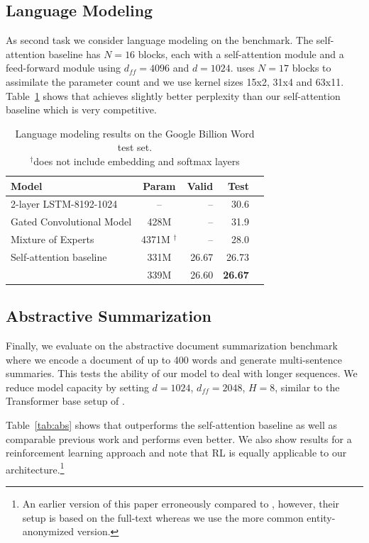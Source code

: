 \subsection{Language Modeling}\label{sec:lm}

As second task we consider language modeling on the \gbw{} benchmark. 
The self-attention baseline has $N=16$ blocks, each with a self-attention module and a feed-forward module using $d_{ff} = 4096$ and $d=1024$.
\tvsdconv{} uses $N=17$ blocks to assimilate the parameter count and we use kernel sizes 15x2, 31x4 and 63x11.
Table~\ref{tab:gbw_lm} shows that \tvsdconv{} achieves slightly better perplexity than our self-attention baseline which is very competitive.

\begin{table}
\centering
\begin{tabular}{lcrrr}
\toprule
Model & Param & Valid & Test \\
\midrule
2-layer LSTM-8192-1024 \citep{jozefowicz2016lm} & -- & -- & 30.6 \\
Gated Convolutional Model \citep{dauphin2017convlm} & 428M & -- & 31.9  \\
Mixture of Experts \citep{shazeer2017outrageously} & 4371M $^\dagger$ & -- & 28.0 \\
\midrule
Self-attention baseline & 331M & 26.67 & 26.73 \\  
\tvsdconv{} & 339M & 26.60 & \textbf{26.67} \\ 
\bottomrule
\end{tabular}
\caption{Language modeling results on the Google Billion Word test set. \\
\small{$^\dagger$does not include embedding and softmax layers}}
\label{tab:gbw_lm}
\end{table}


\subsection{Abstractive Summarization}\label{sec:abs}

Finally, we evaluate on the \cnndm{} abstractive document summarization benchmark where we encode a document of up to 400 words and generate multi-sentence summaries. 
This tests the ability of our model to deal with longer sequences.
We reduce model capacity by setting $d=1024$, $d_{ff}=2048$, $H=8$, similar to the Transformer base setup of \citet{vaswani2017transformer}.

Table~\ref{tab:abs} shows that \sdconv{} outperforms the self-attention baseline as well as comparable previous work and \tvsdconv{} performs even better.
We also show results for a reinforcement learning approach \citep{celikyilmaz2018deep} and note that RL is equally applicable to our architecture.\footnote{An earlier version of this paper erroneously compared to \citet{gehrmann2018bottom}, however, their setup is based on the full-text \cnndm{} whereas we use the more common entity-anonymized version.}

